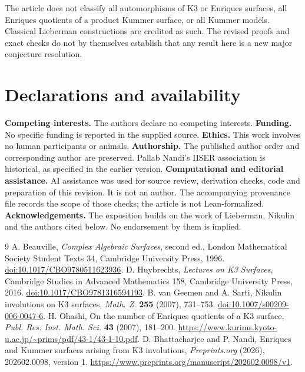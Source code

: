 \documentclass[11pt]{amsart}
\theoremstyle{definition}
\begin{document}
The article does not classify all automorphisms of K3 or Enriques
surfaces, all Enriques quotients of a product Kummer surface, or all
Kummer models. Classical Lieberman constructions are credited as such.
The revised proofs and exact checks do not by themselves establish
that any result here is a new major conjecture resolution.

\section*{Declarations and availability}
\textbf{Competing interests.} The authors declare no competing interests.
\textbf{Funding.} No specific funding is reported in the supplied source.
\textbf{Ethics.} This work involves no human participants or animals.
\textbf{Authorship.} The published author order and corresponding author
are preserved. Pallab Nandi's IISER association is historical, as
specified in the earlier version.
\textbf{Computational and editorial assistance.} AI assistance was used
for source review, derivation checks, code and preparation of this
revision. It is not an author. The accompanying provenance file records
the scope of those checks; the article is not Lean-formalized.
\textbf{Acknowledgements.} The exposition builds on the work of
Lieberman, Nikulin and the authors cited below. No endorsement by them
is implied.


\begin{thebibliography}{9}
 A. Beauville, \emph{Complex Algebraic Surfaces},
second ed., London Mathematical Society Student Texts 34, Cambridge
University Press, 1996. \href{https://doi.org/10.1017/CBO9780511623936}{doi:10.1017/CBO9780511623936}.
 D. Huybrechts, \emph{Lectures on K3 Surfaces},
Cambridge Studies in Advanced Mathematics 158, Cambridge University
Press, 2016. \href{https://doi.org/10.1017/CBO9781316594193}{doi:10.1017/CBO9781316594193}.
 B. van Geemen and A. Sarti, Nikulin involutions on K3
surfaces, \emph{Math. Z.} \textbf{255} (2007), 731--753.
\href{https://doi.org/10.1007/s00209-006-0047-6}{doi:10.1007/s00209-006-0047-6}.
 H. Ohashi, On the number of Enriques quotients of a K3
surface, \emph{Publ. Res. Inst. Math. Sci.} \textbf{43} (2007), 181--200.
\url{https://www.kurims.kyoto-u.ac.jp/~prims/pdf/43-1/43-1-10.pdf}.
 D. Bhattacharjee and P. Nandi, Enriques and Kummer
surfaces arising from K3 involutions, \emph{Preprints.org} (2026),
202602.0098, version 1. \url{https://www.preprints.org/manuscript/202602.0098/v1}.
\end{thebibliography}
\end{document}
